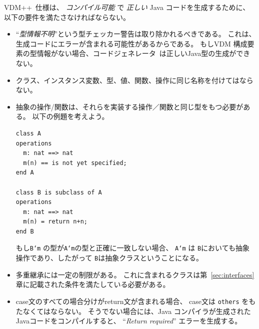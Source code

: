 \documentclass[\pformat,11pt]{jarticle}
\newcommand{\Tcg}{コードジェネレータ}
\newcommand{\VDM}{VDM++}
\begin{document}
\VDM\ 仕様は、 {\em コンパイル可能} で {\em 正しい} Java コードを生成するために、以下の要件を満たさなければならない。

\begin{itemize}
\item ``{\em 型情報不明}''という型チェッカー警告は取り除かれるべきである。
これは、生成コードにエラーが含まれる可能性があるからである。
もしVDM 構成要素の型情報がない場合、\Tcg\ は正しいJava型の生成ができない。

\item クラス、インスタンス変数、型、値、関数、操作に同じ名称を付けてはならない。
%

\item 抽象の操作/関数は、それらを実装する操作／関数と同じ型をもつ必要がある。
以下の例題を考えよう。
\begin{screen}
\begin{small}
\begin{verbatim}
class A
operations
  m: nat ==> nat
  m(n) == is not yet specified;
end A

class B is subclass of A
operations
  m: nat ==> nat
  m(n) = return n+n;
end B
\end{verbatim}
\end{small}
\end{screen}
もし\texttt{B`m} の型が\texttt{A`m}の型と正確に一致しない場合、
\texttt{A`m} は \texttt{B}においても抽象操作であり、したがって \texttt{B}は抽象クラスということになる。

\item 多重継承には一定の制限がある。 
これに含まれるクラスは第~\ref{sec:interfaces}章に記載された条件を満たしている必要がある。

\item case文のすべての場合分けがreturn文が含まれる場合、
case文は {\tt others} をもたなくてはならない。
そうでない場合には、Java コンパイラが生成されたJavaコードをコンパイルすると、
``{\em Return required}'' エラーを生成する。


\end{itemize}
\end{document}
